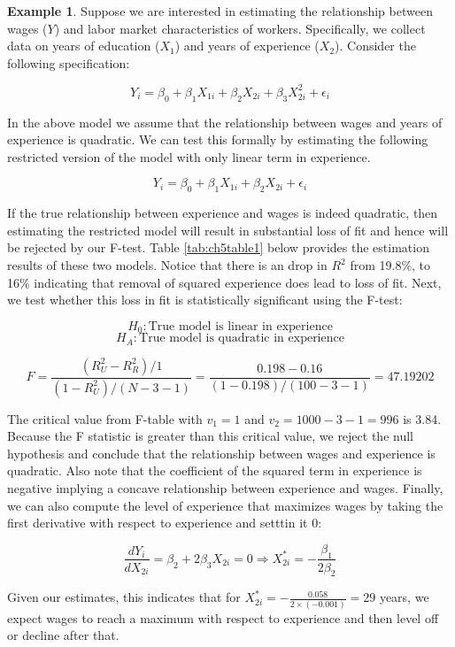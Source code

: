 \documentclass[
]{book}
\theoremstyle{definition}
\theoremstyle{definition}
\newtheorem{example}{Example}[chapter]
\theoremstyle{definition}
\theoremstyle{definition}
\theoremstyle{remark}
\begin{document}
\begin{example}
\protect\hypertarget{exm:unnamed-chunk-80}{}\label{exm:unnamed-chunk-80}Suppose we are interested in estimating the relationship between wages (\(Y\)) and labor market characteristics of workers. Specifically, we collect data on years of education (\(X_1\)) and years of experience (\(X_2\)). Consider the following specification:

\[Y_i= \beta_0 + \beta_1 X_{1i} + \beta_2 X_{2i} + \beta_3 X_{2i}^2 + \epsilon_i\]

In the above model we assume that the relationship between wages and years of experience is quadratic. We can test this formally by estimating the following restricted version of the model with only linear term in experience.

\[Y_i= \beta_0 + \beta_1 X_{1i} + \beta_2 X_{2i} + \epsilon_i\]

If the true relationship between experience and wages is indeed quadratic, then estimating the restricted model will result in substantial loss of fit and hence will be rejected by our F-test. Table \ref{tab:ch5table1} below provides the estimation results of these two models. Notice that there is an drop in \(R^2\) from 19.8\%, to 16\% indicating that removal of squared experience does lead to loss of fit. Next, we test whether this loss in fit is statistically significant using the F-test:

\[H_0: \text{True model is linear in experience} \]
\[H_A: \text{True model is quadratic in experience}\]

\[F=\frac{(R^2_U-R^2_R)/1}{(1-R^2_U)/(N-3-1)}=\frac{0.198-0.16}{(1-0.198)/(100-3-1)}=47.19202\]

The critical value from F-table with \(v_1=1\) and \(v_2=1000-3-1=996\) is 3.84. Because the F statistic is greater than this critical value, we reject the null hypothesis and conclude that the relationship between wages and experience is quadratic. Also note that the coefficient of the squared term in experience is negative implying a concave relationship between experience and wages. Finally, we can also compute the level of experience that maximizes wages by taking the first derivative with respect to experience and setttin it 0:

\[\frac{dY_i}{d X_{2i}}= \beta_2 + 2\beta_3 X_{2i}=0 \Rightarrow X^*_{2i}=-\frac{\beta_1}{2\beta_2}\]

Given our estimates, this indicates that for \(X^*_{2i}=-\displaystyle \frac{0.058}{2\times (-0.001)}=29\) years, we expect wages to reach a maximum with respect to experience and then level off or decline after that.
\end{example}
\end{document}
